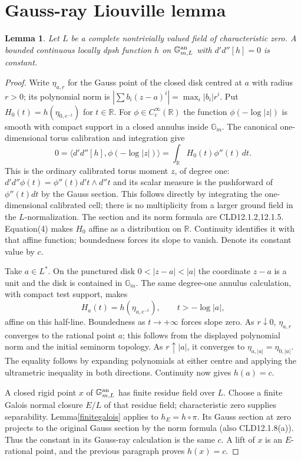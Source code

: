 \documentclass[11pt]{article}
\newtheorem{lemma}[theorem]{Lemma}
\newcommand{\DD}{d'd''}
\begin{document}
\section{Gauss-ray Liouville lemma}
\begin{lemma}\label{liouville}
Let $L$ be a complete nontrivially valued field of characteristic zero.
A bounded continuous locally dpsh function $h$ on
$\mathbb G_{m,L}^{\rm an}$ with $\DD[h]=0$ is constant.
\end{lemma}
\begin{proof}
Write $\eta_{a,r}$ for the Gauss point of the closed disk centred at
$a$ with radius $r>0$; its polynomial norm is
$\left|\sum b_i(z-a)^i\right|=\max_i|b_i|r^i$.
Put $H_0(t)=h(\eta_{0,e^{-t}})$ for $t\in\mathbb R$.
For $\phi\in C_c^\infty(\mathbb R)$ the function
$\phi(-\log|z|)$ is smooth with compact support in a closed annulus
inside $\mathbb G_m$. The canonical one-dimensional torus calibration
and integration give
\[
 0=\langle\DD[h],\phi(-\log|z|)\rangle
       =\int_{\mathbb R} H_0(t)\phi''(t)\,dt.       \tag{4}
\]
This is the ordinary calibrated torus moment $z$, of degree one:
$\DD\phi(t)=\phi''(t)d't\wedge d''t$ and its scalar measure is
the pushforward of $\phi''(t)dt$ by the Gauss section. This follows
directly by integrating the one-dimensional calibrated cell; there
is no multiplicity from a larger ground field in the $L$-normalization.
The section and its norm formula are CLD12.1.2,12.1.5.
Equation(4) makes $H_0$ affine as a distribution on $\mathbb R$.
Continuity identifies it with that affine function; boundedness
forces its slope to vanish. Denote its constant value by $c$.

Take $a\in L^*$. On the punctured disk $0<|z-a|<|a|$ the coordinate
$z-a$ is a unit and the disk is contained in $\mathbb G_m$.
The same degree-one annulus calculation, with compact test support,
makes
\[
 H_a(t)=h(\eta_{a,e^{-t}}),\qquad t>-\log|a|,
\]
affine on this half-line. Boundedness as $t\to+\infty$ forces slope
zero. As $r\downarrow0$, $\eta_{a,r}$ converges to the rational
point $a$; this follows from the displayed polynomial norm and the
initial seminorm topology. As $r\uparrow|a|$, it converges to
$\eta_{a,|a|}=\eta_{0,|a|}$. The equality follows by expanding
polynomials at either centre and applying the ultrametric inequality
in both directions. Continuity now gives $h(a)=c$.

A closed rigid point $x$ of $\mathbb G_{m,L}^{\rm an}$ has finite
residue field over $L$. Choose a finite Galois normal closure $E/L$
of that residue field; characteristic zero supplies separability.
Lemma\ref{finitegalois} applies to $h_E=h\circ\pi$. Its Gauss
section at zero projects to the original Gauss section by the norm
formula (also CLD12.1.8(a)). Thus the constant in its Gauss-ray
calculation is the same $c$. A lift of $x$ is an $E$-rational point,
and the previous paragraph proves $h(x)=c$.


\end{proof}
\end{document}
